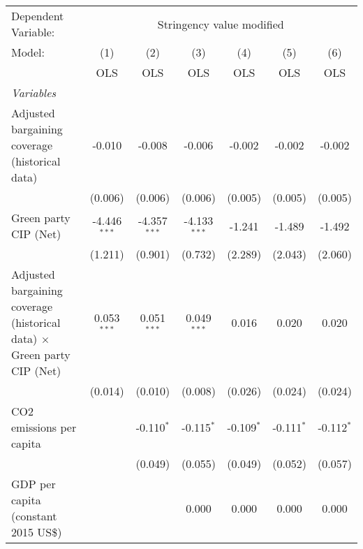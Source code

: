 
\begingroup
\centering
\begin{tabular}{lcccccc}
   \toprule
   Dependent Variable: & \multicolumn{6}{c}{Stringency value modified}\\
   Model:                                                                         & (1)            & (2)            & (3)            & (4)          & (5)          & (6)\\  
                                                                                  &  OLS           & OLS            & OLS            & OLS          & OLS          & OLS\\  
   \midrule
   \emph{Variables}\\
   Adjusted bargaining coverage (historical data)                                 & -0.010         & -0.008         & -0.006         & -0.002       & -0.002       & -0.002\\   
                                                                                  & (0.006)        & (0.006)        & (0.006)        & (0.005)      & (0.005)      & (0.005)\\   
   Green party CIP (Net)                                                          & -4.446$^{***}$ & -4.357$^{***}$ & -4.133$^{***}$ & -1.241       & -1.489       & -1.492\\   
                                                                                  & (1.211)        & (0.901)        & (0.732)        & (2.289)      & (2.043)      & (2.060)\\   
   Adjusted bargaining coverage (historical data) $\times$ Green party CIP (Net)  & 0.053$^{***}$  & 0.051$^{***}$  & 0.049$^{***}$  & 0.016        & 0.020        & 0.020\\   
                                                                                  & (0.014)        & (0.010)        & (0.008)        & (0.026)      & (0.024)      & (0.024)\\   
   CO2 emissions per capita                                                       &                & -0.110$^{*}$   & -0.115$^{*}$   & -0.109$^{*}$ & -0.111$^{*}$ & -0.112$^{*}$\\   
                                                                                  &                & (0.049)        & (0.055)        & (0.049)      & (0.052)      & (0.057)\\   
   GDP per capita (constant 2015 US\$)                                            &                &                & 0.000          & 0.000        & 0.000        & 0.000\\   

\end{tabular}
